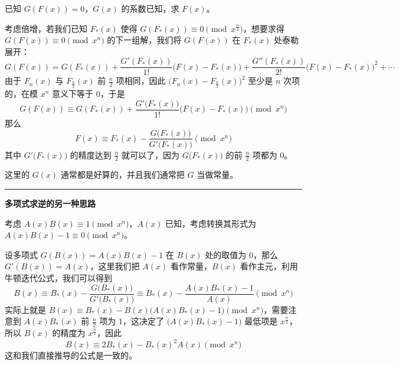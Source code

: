 已知 $G(F(x)) = 0$，$G(x)$ 的系数已知，求 $F(x)$。

考虑倍增，若我们已知 $F_*(x)$ 使得 $G(F_*(x)) \equiv 0 \pmod{x^{\frac{n}{2}}}$，想要求得 $G(F(x)) \equiv 0 \pmod{x^n}$ 的下一组解，我们将 $G(F(x))$ 在 $F_*(x)$ 处泰勒展开：
\[
G(F(x)) = G(F_*(x)) + \frac{G'(F_*(x))}{1!}\bigl(F(x) - F_*(x)\bigr) + \frac{G''(F_*(x))}{2!}\bigl(F(x) - F_*(x)\bigr)^2 + \cdots
\]
由于 $F_n(x)$ 与 $F_{\frac{n}{2}}(x)$ 前 $\frac{n}{2}$ 项相同，因此 $\bigl(F_n(x) - F_{\frac{n}{2}}(x)\bigr)^2$ 至少是 $n$ 次项的，在模 $x^n$ 意义下等于 $0$，于是
\[
G(F(x)) \equiv G(F_*(x)) + \frac{G'\bigl(F_*(x)\bigr)}{1!}\bigl(F(x) - F_*(x)\bigr) \pmod{x^n}
\]
那么
\[
F(x) \equiv F_*(x) - \frac{G\bigl(F_*(x)\bigr)}{G'\bigl(F_*(x)\bigr)} \pmod{x^n}
\]
其中 $G'\bigl(F_*(x)\bigr)$ 的精度达到 $\frac{n}{2}$ 就可以了，因为 $G\bigl(F_*(x)\bigr)$ 的前 $\frac{n}{2}$ 项都为 $0$。

这里的 $G(x)$ 通常都是好算的，并且我们通常把 $G$ 当做常量。

\vspace{2ex}
\noindent\rule{\linewidth}{0.4pt}
\vspace{2ex}

\textbf{多项式求逆的另一种思路}

考虑 $A(x)B(x) \equiv 1 \pmod{x^n}$，$A(x)$ 已知，考虑转换其形式为 $A(x)B(x) - 1 \equiv 0 \pmod{x^n}$。

设多项式 $G(B(x)) = A(x)B(x) - 1$ 在 $B(x)$ 处的取值为 $0$，那么 $G'(B(x)) = A(x)$，这里我们把 $A(x)$ 看作常量，$B(x)$ 看作主元，利用牛顿迭代公式，我们可以得到
\[
B(x) \equiv B_*(x) - \frac{G\bigl(B_*(x)\bigr)}{G'\bigl(B_*(x)\bigr)} \equiv B_*(x) - \frac{A(x)B_*(x) - 1}{A(x)} \pmod{x^n}
\]
实际上就是 $B(x) \equiv B_*(x) - B(x)\bigl(A(x)B_*(x) - 1\bigr) \pmod{x^n}$，需要注意到 $A(x)B_*(x)$ 前 $\frac{n}{2}$ 项为 $1$，这决定了 $\bigl(A(x)B_*(x) - 1\bigr)$ 最低项是 $x^{\frac{n}{2}}$，所以 $B(x)$ 的精度为 $x^{\frac{n}{2}}$，因此
\[
B(x) \equiv 2B_*(x) - B_*(x)^2A(x) \pmod{x^n}
\]
这和我们直接推导的公式是一致的。